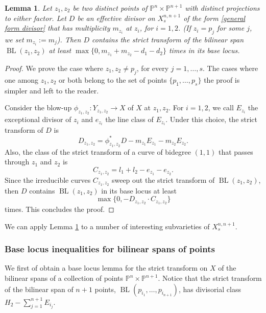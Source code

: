 \documentclass[a4paper,11pt]{article}
\newtheorem{lemma}[theorem]{Lemma}
\newcommand{\BL}{\operatorname{BL}}
\newcommand{\ourproduct}{\mathbb P^n \times \mathbb P^{n+1}}
\newcommand{\ourproductblowup}[1]{X^{n,n+1}_{#1}}
\begin{document}
\begin{lemma}\label{recipe-BLI-bilinear joins}
 Let $z_1,z_2$ be two distinct points of $\ourproduct$ with distinct projections to either factor. 
 Let $D$ be an effective divisor on $\ourproductblowup{s}$ of the form \eqref{general form divisor} that has multiplicity $m_{z_i}$ at $z_i$, for $i=1,2$. (If $z_i=p_j$ for some $j$, we set $m_{z_i}:=m_j$). Then $D$ contains the strict transform of the bilinear span $\BL(z_1,z_2)$ at least $\max\{0,m_{z_1}+m_{z_2}-d_1-d_2\}$ times in its base locus.
\end{lemma}
\begin{proof}
We prove the case where $z_1,z_2\neq p_j$, for every $j=1,\dots,s$. The cases where one among $z_1,z_2$ or both belong to the set of points $\{p_1,\dots,p_s\}$ the proof is simpler and left to the reader.

Consider the blow-up $\phi_{z_1,z_2}: Y_{z_1,z_2}\to X$ of $X$ at $z_1,z_2$. For $i=1,2$, we call $E_{z_i}$ the exceptional divisor of $z_i$ and $e_{z_i}$ the line class of $E_{z_i}$. Under this choice, the strict transform of $D$ is 
$$D_{z_1,z_2}=\phi_{z_1,z_2}^\ast D-m_{z_1}E_{z_1}-m_{z_2}E_{z_2}.$$
Also, the class of the strict transform of a curve of bidegree $(1,1)$ that passes through $z_1$ and $z_2$ is 
$$C_{z_1,z_2}=l_1+l_2-e_{z_1}-e_{z_2}.$$ 
Since the irreducible curves $C_{z_1,z_2}$ sweep out the strict transform of $\BL(z_1,z_2)$, then $D$ contains $\BL(z_1,z_2)$ in its base locus at least 
$$
\max\{0,-D_{z_1,z_2}\cdot C_{z_1,z_2}\}
$$
times. This concludes the proof.
\end{proof}

We can apply Lemma \ref{recipe-BLI-bilinear joins} to a number of interesting subvarieties of $\ourproductblowup{s}$. 

\subsubsection{Base locus inequalities for bilinear spans of points}
We first of obtain a base locus lemma for the strict transform on $X$ of the bilinear spans of a collection of points $\ourproduct$.
%
Notice that the strict transform of the bilinear span of $n+1$ points, $\BL(p_{i_1},\dots,p_{i_{n+1}})$, has divisorial class $H_2-\sum_{j=1}^{n+1}E_{i_j}$.
\end{document}
